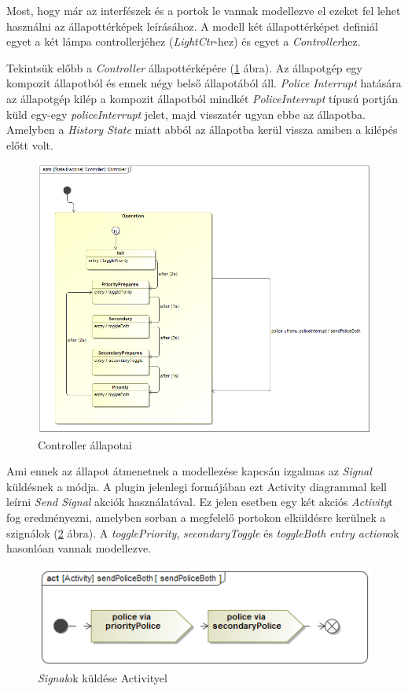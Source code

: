 Most, hogy már az interfészek és a portok le vannak modellezve el ezeket fel lehet használni az állapottérképek leírásához. A modell két állapottérképet definiál egyet a két lámpa controllerjéhez (\emph{LightCtr}-hez) és egyet a \emph{Controller}hez.

Tekintsük előbb a \emph{Controller} állapottérképére (\ref{fig:ControllerSM} ábra). Az állapotgép egy kompozit állapotból és ennek négy belső állapotából áll. \emph{Police Interrupt} hatására az állapotgép kilép a kompozit állapotból mindkét \emph{PoliceInterrupt} típusú portján küld egy-egy \emph{policeInterrupt} jelet, majd visszatér ugyan ebbe az állapotba. Amelyben a \emph{History State} miatt abból az állapotba kerül vissza amiben a kilépés előtt volt.

\begin{figure}[!ht]
	\centering
	\includegraphics[width=12cm, keepaspectratio]{figures/contribution/ControllerSM.png}
	\caption{Controller állapotai}
	\label{fig:ControllerSM}
\end{figure}

Ami ennek az állapot átmenetnek a modellezése kapcsán izgalmas az \emph{Signal} küldésnek a módja. A plugin jelenlegi formájában ezt Activity diagrammal kell leírni \emph{Send Signal} akciók használatával. Ez jelen esetben egy két akciós \emph{Activity}t fog eredményezni, amelyben sorban a megfelelő portokon elküldésre kerülnek a szignálok (\ref{fig:activity} ábra).  A \emph{togglePriority}, \emph{secondaryToggle} és \emph{toggleBoth} \emph{entry action}ok hasonlóan vannak modellezve.

\begin{figure}[!ht]
	\centering
	\includegraphics[width=12cm, keepaspectratio]{figures/contribution/sendPoliceBoth.png}
	\caption{\emph{Signal}ok küldése Activityel}
	\label{fig:activity}
\end{figure}

